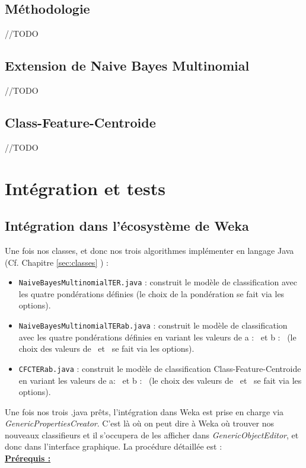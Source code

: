 \documentclass{article}
\begin{document}
\subsection{Méthodologie}
//TODO
\subsection{Extension de Naive Bayes Multinomial}
//TODO
\subsection{Class-Feature-Centroide}
//TODO



\section{Intégration et tests}
\subsection{Intégration dans l'écosystème de Weka}
Une fois nos classes, et donc nos trois algorithmes implémenter en langage Java (Cf. Chapitre \ref{sec:classes} ) :
\begin{itemize}
\item  \texttt{NaiveBayesMultinomialTER.java} : construit le modèle de classification avec les quatre pondérations définies (le choix de la pondération se fait via les options).
\item  \texttt{NaiveBayesMultinomialTERab.java} : construit le modèle de classification avec les quatre pondérations définies en variant les valeurs de a : \textalpha \ et b : \textbeta \ (le choix des valeurs de \textalpha \ et \textbeta \ se fait via les options).
\item  \texttt{CFCTERab.java} : construit le modèle de classification Class-Feature-Centroide en variant les valeurs de a: \textalpha \ et b : \textbeta \ (le choix des valeurs de \textalpha \ et \textbeta \ se fait via les options).
\end{itemize}
Une fois nos trois .java prêts, l'intégration dans Weka est prise en charge via  \textit{GenericPropertiesCreator}. C'est là où on peut dire à Weka où trouver nos nouveaux classifieurs et il s'occupera de les afficher dans  \textit{GenericObjectEditor}, et donc dans l'interface graphique. La procédure détaillée est : \\
\textbf{\underline{Prérequis :}}
\end{document}

